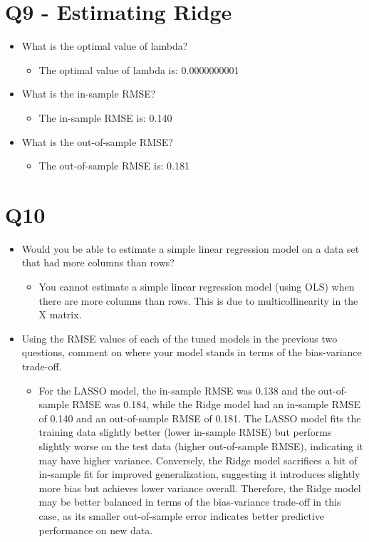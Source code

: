 \documentclass{article}
\begin{document}
\section{Q9 - Estimating Ridge}

\begin{itemize}
    \item What is the optimal value of lambda?
    \begin{itemize}
        \item The optimal value of lambda is: 0.0000000001
    \end{itemize}

    \item What is the in-sample RMSE?
    \begin{itemize}
        \item The in-sample RMSE is: 0.140
    \end{itemize}

    \item What is the out-of-sample RMSE?
    \begin{itemize}
        \item The out-of-sample RMSE is: 0.181
    \end{itemize}
\end{itemize}

\section{Q10}

\begin{itemize}
    \item Would you be able to estimate a simple linear regression model on a data set that had more columns than rows?
    \begin{itemize}
        \item You cannot estimate a simple linear regression model (using OLS) when there are more columns than rows. This is due to multicollinearity in the X matrix. 
    \end{itemize}
    
    \item Using the RMSE values of each of the tuned models in the previous two questions, comment on where your model stands in terms of the bias-variance trade-off.

    \begin{itemize}
        \item For the LASSO model, the in-sample RMSE was 0.138 and the out-of-sample RMSE was 0.184, while the Ridge model had an in-sample RMSE of 0.140 and an out-of-sample RMSE of 0.181. The LASSO model fits the training data slightly better (lower in-sample RMSE) but performs slightly worse on the test data (higher out-of-sample RMSE), indicating it may have higher variance. Conversely, the Ridge model sacrifices a bit of in-sample fit for improved generalization, suggesting it introduces slightly more bias but achieves lower variance overall. Therefore, the Ridge model may be better balanced in terms of the bias-variance trade-off in this case, as its smaller out-of-sample error indicates better predictive performance on new data. 
    \end{itemize}
\end{itemize}
\end{document}
